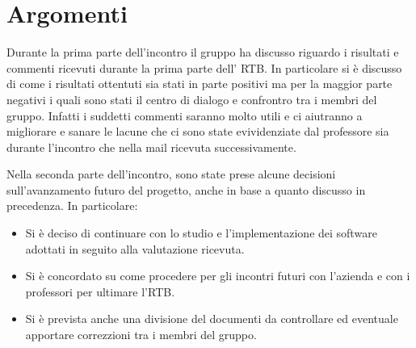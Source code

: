 \section{Argomenti}
Durante la prima parte dell'incontro il gruppo ha discusso riguardo i risultati e commenti ricevuti durante la prima parte dell' RTB.
In particolare si è discusso di come i risultati ottentuti sia stati in parte positivi ma per la maggior parte negativi i quali sono stati il centro di dialogo e confrontro tra i membri del gruppo.
Infatti i suddetti commenti saranno molto utili e ci aiutranno a migliorare e sanare le lacune che ci sono state evividenziate dal professore sia durante l'incontro che nella mail ricevuta successivamente.
\bigskip

\noindent Nella seconda parte dell'incontro, sono state prese alcune decisioni sull'avanzamento futuro del progetto, anche in base a quanto discusso in precedenza. In particolare:
\begin{itemize}
    \item Si è deciso di continuare con lo studio e l'implementazione dei software adottati in seguito alla valutazione ricevuta.
    \item Si è concordato su come procedere per gli incontri futuri con l'azienda e con i professori per ultimare l'RTB.
    \item Si è prevista anche una divisione del documenti da controllare ed eventuale apportare correzzioni tra i membri del gruppo.
\end{itemize}